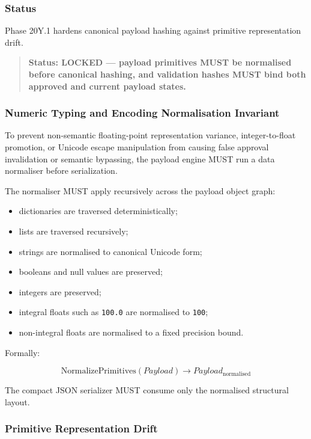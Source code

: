 \subsubsection{Status}

Phase 20Y.1 hardens canonical payload hashing against primitive representation drift.

\begin{quote}
\textbf{Status: LOCKED --- payload primitives MUST be normalised before canonical hashing, and validation hashes MUST bind both approved and current payload states.}
\end{quote}

\subsubsection{Numeric Typing and Encoding Normalisation Invariant}

To prevent non-semantic floating-point representation variance, integer-to-float promotion, or Unicode escape manipulation from causing false approval invalidation or semantic bypassing, the payload engine MUST run a data normaliser before serialization.

The normaliser MUST apply recursively across the payload object graph:

\begin{itemize}
  \item dictionaries are traversed deterministically;
  \item lists are traversed recursively;
  \item strings are normalised to canonical Unicode form;
  \item booleans and null values are preserved;
  \item integers are preserved;
  \item integral floats such as \texttt{100.0} are normalised to \texttt{100};
  \item non-integral floats are normalised to a fixed precision bound.
\end{itemize}

Formally:

\begin{equation}
\mathrm{NormalizePrimitives}(Payload)
\longrightarrow
Payload_{\mathrm{normalised}}
\end{equation}

The compact JSON serializer MUST consume only the normalised structural layout.

\subsubsection{Primitive Representation Drift}

